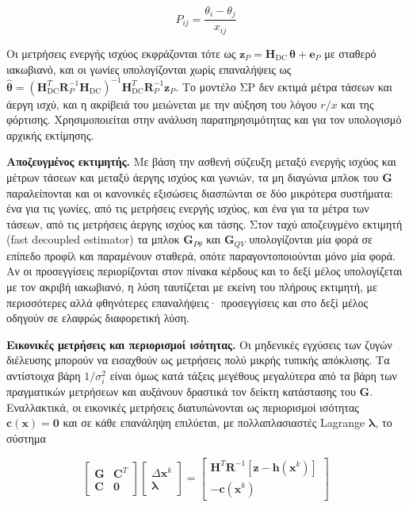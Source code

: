 \begin{equation}
P_{ij} = \frac{\theta_i - \theta_j}{x_{ij}}
\label{eq:dcflow}
\end{equation}

Οι μετρήσεις ενεργής ισχύος εκφράζονται τότε ως $\mathbf{z}_P = \mathbf{H}_{\mathrm{DC}}\,
\boldsymbol{\theta} + \mathbf{e}_P$ με σταθερό ιακωβιανό, και οι γωνίες υπολογίζονται χωρίς
επαναλήψεις ως $\hat{\boldsymbol{\theta}} = (\mathbf{H}_{\mathrm{DC}}^{T}\mathbf{R}_P^{-1}
\mathbf{H}_{\mathrm{DC}})^{-1}\mathbf{H}_{\mathrm{DC}}^{T}\mathbf{R}_P^{-1}\mathbf{z}_P$. Το
μοντέλο ΣΡ δεν εκτιμά μέτρα τάσεων και άεργη ισχύ, και η ακρίβειά του μειώνεται με την αύξηση
του λόγου $r/x$ και της φόρτισης. Χρησιμοποιείται στην ανάλυση παρατηρησιμότητας και για
τον υπολογισμό αρχικής εκτίμησης.

\textbf{Αποζευγμένος εκτιμητής.} Με βάση την ασθενή σύζευξη μεταξύ ενεργής ισχύος και μέτρων
τάσεων και μεταξύ άεργης ισχύος και γωνιών, τα μη διαγώνια μπλοκ του $\mathbf{G}$ παραλείπονται
και οι κανονικές εξισώσεις διασπώνται σε δύο μικρότερα συστήματα: ένα για τις γωνίες, από
τις μετρήσεις ενεργής ισχύος, και ένα για τα μέτρα των τάσεων, από τις μετρήσεις άεργης
ισχύος και τάσης. Στον ταχύ αποζευγμένο εκτιμητή (fast decoupled estimator) τα μπλοκ
$\mathbf{G}_{P\theta}$ και $\mathbf{G}_{QV}$ υπολογίζονται μία φορά σε επίπεδο προφίλ και
παραμένουν σταθερά, οπότε παραγοντοποιούνται μόνο μία φορά. Αν οι προσεγγίσεις περιορίζονται
στον πίνακα κέρδους και το δεξί μέλος υπολογίζεται με τον ακριβή ιακωβιανό, η λύση ταυτίζεται
με εκείνη του πλήρους εκτιμητή, με περισσότερες αλλά φθηνότερες επαναλήψεις· προσεγγίσεις και
στο δεξί μέλος οδηγούν σε ελαφρώς διαφορετική λύση.

\textbf{Εικονικές μετρήσεις και περιορισμοί ισότητας.} Οι μηδενικές εγχύσεις των ζυγών
διέλευσης μπορούν να εισαχθούν ως μετρήσεις πολύ μικρής τυπικής απόκλισης. Τα αντίστοιχα βάρη
$1/\sigma_i^2$ είναι όμως κατά τάξεις μεγέθους μεγαλύτερα από τα βάρη των πραγματικών
μετρήσεων και αυξάνουν δραστικά τον δείκτη κατάστασης του $\mathbf{G}$. Εναλλακτικά, οι
εικονικές μετρήσεις διατυπώνονται ως περιορισμοί ισότητας $\mathbf{c}(\mathbf{x}) = \mathbf{0}$
και σε κάθε επανάληψη επιλύεται, με πολλαπλασιαστές Lagrange $\boldsymbol{\lambda}$, το σύστημα

\begin{equation}
\begin{bmatrix} \mathbf{G} & \mathbf{C}^{T} \\ \mathbf{C} & \mathbf{0} \end{bmatrix}
\begin{bmatrix} \Delta\mathbf{x}^{k} \\ \boldsymbol{\lambda} \end{bmatrix}
=
\begin{bmatrix} \mathbf{H}^{T}\mathbf{R}^{-1}\left[\mathbf{z} - \mathbf{h}(\mathbf{x}^{k})\right] \\ -\mathbf{c}(\mathbf{x}^{k}) \end{bmatrix}
\label{eq:eqconstr}
\end{equation}

